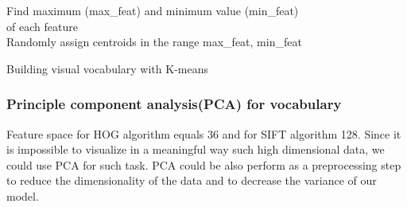 \begin{algorithm}[H]
 Find maximum (max\_feat) and minimum value (min\_feat)\\
 of each feature \\
 Randomly assign centroids in the range \<max\_feat, min\_feat\>\\
 
 \caption{Building visual vocabulary with K-means}
\end{algorithm}


        \subsubsection*{Principle component analysis(PCA) for vocabulary}
Feature space for HOG algorithm equals 36 and for SIFT algorithm 128. Since it is impossible to visualize in a meaningful way such high dimensional data, we could use PCA for such task. PCA could be also perform as a preprocessing step to reduce the dimensionality of the data and to decrease the variance of our model.

